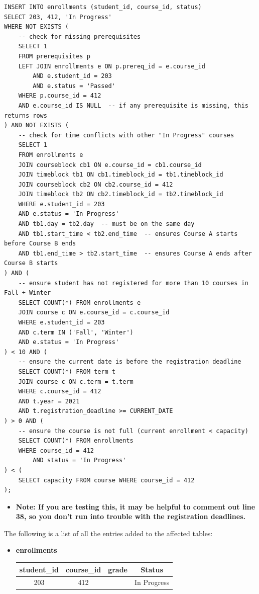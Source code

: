 \documentclass{report}
\makeatletter
\newenvironment{fullcenter}%
    {\@parboxrestore%
    \begin{adjustwidth}{}{\leftmargin}%
    \begin{center}%
    }{\end{center}%
    \end{adjustwidth}%
    }
\makeatother
\begin{document}
\begin{lstlisting}
INSERT INTO enrollments (student_id, course_id, status)
SELECT 203, 412, 'In Progress'
WHERE NOT EXISTS (
    -- check for missing prerequisites
    SELECT 1
    FROM prerequisites p
    LEFT JOIN enrollments e ON p.prereq_id = e.course_id
        AND e.student_id = 203
        AND e.status = 'Passed'
    WHERE p.course_id = 412
    AND e.course_id IS NULL  -- if any prerequisite is missing, this returns rows
) AND NOT EXISTS (
    -- check for time conflicts with other "In Progress" courses
    SELECT 1
    FROM enrollments e
    JOIN courseblock cb1 ON e.course_id = cb1.course_id
    JOIN timeblock tb1 ON cb1.timeblock_id = tb1.timeblock_id
    JOIN courseblock cb2 ON cb2.course_id = 412
    JOIN timeblock tb2 ON cb2.timeblock_id = tb2.timeblock_id
    WHERE e.student_id = 203
    AND e.status = 'In Progress'
    AND tb1.day = tb2.day  -- must be on the same day
    AND tb1.start_time < tb2.end_time  -- ensures Course A starts before Course B ends
    AND tb1.end_time > tb2.start_time  -- ensures Course A ends after Course B starts
) AND (
    -- ensure student has not registered for more than 10 courses in Fall + Winter
    SELECT COUNT(*) FROM enrollments e
    JOIN course c ON e.course_id = c.course_id
    WHERE e.student_id = 203
    AND c.term IN ('Fall', 'Winter')
    AND e.status = 'In Progress'
) < 10 AND (
    -- ensure the current date is before the registration deadline
    SELECT COUNT(*) FROM term t
    JOIN course c ON c.term = t.term
    WHERE c.course_id = 412
    AND t.year = 2021
    AND t.registration_deadline >= CURRENT_DATE
) > 0 AND (
    -- ensure the course is not full (current enrollment < capacity)
    SELECT COUNT(*) FROM enrollments
    WHERE course_id = 412
        AND status = 'In Progress'
) < (
    SELECT capacity FROM course WHERE course_id = 412
);
\end{lstlisting}
\begin{itemize}
    \item \textbf{Note: If you are testing this, it may be helpful to comment out line 38, so you don't run into trouble with the registration deadlines.}
\end{itemize}

The following is a list of all the entries added to the affected tables:

\begin{itemize}
    \item \textbf{enrollments}
    \bigskip
    \begin{fullcenter}
        \begin{tabular}{| c | c | c | c |}
            \hline
            \textbf{student\_id} & \textbf{course\_id} & \textbf{grade} & \textbf{Status} \\
            \hline 
            203 & 412 & & In Progress \\
            \hline
        \end{tabular}
    \end{fullcenter}
\end{itemize}
\end{document}
